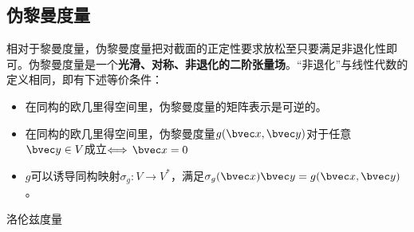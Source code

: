 \subsection{伪黎曼度量}
相对于黎曼度量，伪黎曼度量把对截面的正定性要求放松至只要满足非退化性即可。伪黎曼度量是一个\textbf{光滑、对称、非退化的二阶张量场}。“非退化”与线性代数的定义相同，即有下述等价条件：
\begin{itemize}
\item 在同构的欧几里得空间里，伪黎曼度量的矩阵表示是可逆的。
\item 在同构的欧几里得空间里，伪黎曼度量$g(\bvec x,\bvec y)$对于任意$\bvec y\in V$成立$\Longleftrightarrow\,\bvec x=0$
\item $g$可以诱导同构映射$\sigma_g:V\rightarrow V^*$，满足$\sigma_g(\bvec x)\bvec y=g(\bvec x,\bvec y)$。
\end{itemize}
\begin{example}{洛伦兹度量}

\end{example}